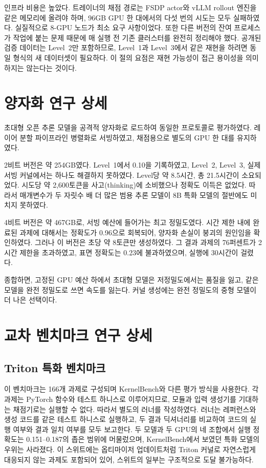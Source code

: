 인프라 비용은 높았다. 트레이너의 채점 경로는 FSDP actor와 vLLM rollout 엔진을 같은 메모리에
올려야 하며, 96GB GPU 한 대에서의 다섯 번의 시도는 모두 실패하였다. 실질적으로 8-GPU 노드가
최소 요구 사항이었다. 또한 다른 버전의 잔여 프로세스가 작업에 붙는 문제 때문에 매 실행 전 기존
클러스터를 완전히 정리해야 했다. 공개된 검증 데이터는 Level~2만 포함하므로, Level~1과 Level~3에서
같은 재현을 하려면 동일 형식의 새 데이터셋이 필요하다. 이 절의 요점은 재현 가능성이 접근 용이성을
의미하지는 않는다는 것이다.

\section{양자화 연구 상세}

초대형 오픈 추론 모델을 공격적 양자화로 로드하여 동일한 프로토콜로 평가하였다. 레이어 분할
파이프라인 병렬화로 서빙하였고, 채점용으로 별도의 GPU 한 대를 유지하였다.

2비트 버전은 약 254GB였다. Level~1에서 0.10을 기록하였고, Level~2, Level~3, 실제 서빙 커널에서는
하나도 해결하지 못하였다. Level당 약 8.5시간, 총 21.5시간이 소요되었다. 시도당 약 2{,}600토큰을
사고(thinking)에 소비했으나 정확도 이득은 없었다. 따라서 매개변수가 두 자릿수 배 더 많은 범용
추론 모델이 8B 특화 모델의 절반에도 미치지 못하였다.

4비트 버전은 약 467GB로, 서빙 예산에 들어가는 최고 정밀도였다. 시간 제한 내에 완료된 과제에 대해서는
정확도가 0.96으로 회복되어, 양자화 손실이 붕괴의 원인임을 확인하였다. 그러나 이 버전은 초당 약
8토큰만 생성하였다. 그 결과 과제의 76퍼센트가 2시간 제한을 초과하였고, 표면 정확도는 0.23에
불과하였으며, 실행에 30시간이 걸렸다.

종합하면, 고정된 GPU 예산 하에서 초대형 모델은 저정밀도에서는 품질을 잃고, 같은 모델을 완전
정밀도로 쓰면 속도를 잃는다. 커널 생성에는 완전 정밀도의 중형 모델이 더 나은 선택이다.

\section{교차 벤치마크 연구 상세}

\subsection{Triton 특화 벤치마크}
이 벤치마크는 166개 과제로 구성되며 KernelBench와 다른 평가 방식을 사용한다. 각 과제는 PyTorch
함수와 테스트 하니스로 이루어지므로, 모듈과 입력 생성기를 기대하는 채점기로는 실행할 수 없다.
따라서 별도의 러너를 작성하였다. 러너는 레퍼런스와 생성 코드를 같은 테스트 하니스로 실행하고,
두 결과 딕셔너리를 비교하여 코드의 실행 여부와 결과 일치 여부를 모두 보고한다. 두 모델과 두 GPU의
네 조합에서 실행 정확도는 0.151--0.187의 좁은 범위에 머물렀으며, KernelBench에서 보였던 특화
모델의 우위는 사라졌다. 이 스위트에는 옵티마이저 업데이트처럼 Triton 커널로 자연스럽게 대응되지
않는 과제도 포함되어 있어, 스위트의 일부는 구조적으로 도달 불가능하다.


